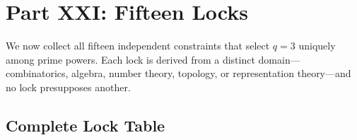 \section{Part XXI: Fifteen Locks}

We now collect all fifteen independent constraints that select $q = 3$ uniquely
among prime powers.  Each lock is derived from a distinct domain---combinatorics,
algebra, number theory, topology, or representation theory---and no lock
presupposes another.

\subsection{Complete Lock Table}

\renewcommand{\arraystretch}{1.35}
\small
\setlength{\LTleft}{0pt}
\setlength{\LTright}{0pt}
